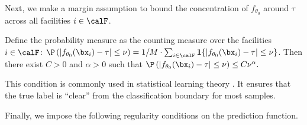 \documentclass[blindrev]{informs3noheader}
\begin{document}
Next, we make a margin assumption to bound the concentration of $f_{\theta_0}$ around $\tau$ across all facilities $i\in\calF$.
\begin{stat}[Margin]\label{ass:margin}
Define the probability measure as the counting measure over the facilities $i\in\calF$: $\P\left(\left|f_{\theta_0}(\bx_{i})-\tau\right|\leq\nu\right)=1/M\cdot\sum_{i\in\calF} \mathbf{1}\{\left|f_{\theta_0}(\bx_{i})-\tau\right|\leq\nu\}$. Then there exist $C>0$ and $\alpha>0$ such that $\P\left(\left|f_{\theta_0}(\bx_{i})-\tau\right|\leq\nu\right)\leq C \nu^{\alpha}.$
\end{stat}
This condition is commonly used in statistical learning theory \citep{boucheron2005theory, tsybakov2004optimal}. It ensures that the true label is ``clear'' from the classification boundary for most samples.

Finally, we impose the following regularity conditions on the prediction function.
\end{document}
